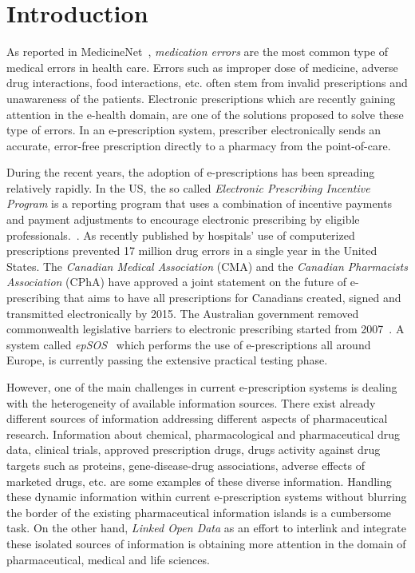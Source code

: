 \documentclass[conference]{IEEEtran}
\begin{document}
\section{Introduction}
\label{intro}

As reported in MedicineNet~\cite{medicationErrors}, \emph{medication errors} are the most common type of medical errors in health care.
Errors such as improper dose of medicine, adverse drug interactions, food interactions, etc. often stem from invalid prescriptions and unawareness of the patients.
Electronic prescriptions which are recently gaining attention in the e-health domain, are one of the solutions proposed to solve these type of errors.
In an e-prescription system, prescriber electronically sends an accurate, error-free prescription directly to a pharmacy from the point-of-care.

During the recent years, the adoption of e-prescriptions has been spreading relatively rapidly.
In the US, the so called \emph{Electronic Prescribing Incentive Program} is a reporting program that uses a combination of incentive payments and payment adjustments to encourage electronic prescribing by eligible professionals.~\cite{epincentive}.
As recently published by \cite{eprescStat2013} hospitals' use of computerized prescriptions prevented 17 million drug errors in a single year in the United States.
The \emph{Canadian Medical Association} (CMA) and the \emph{Canadian Pharmacists Association} (CPhA) have approved a joint statement on the future of e-prescribing that aims to have all prescriptions for Canadians created, signed and transmitted electronically by 2015.
The Australian government removed commonwealth legislative barriers to electronic prescribing started from 2007~\cite{medicare}.
A system called \emph{epSOS}~\cite{epsos} which performs the use of e-prescriptions all around Europe, is currently passing the extensive practical testing phase.

However, one of the main challenges in current e-prescription systems is dealing with the heterogeneity of available information sources.
There exist already different sources of information addressing different aspects of pharmaceutical research.
Information about chemical, pharmacological and pharmaceutical drug data, clinical trials, approved prescription drugs, drugs activity against drug targets such as proteins, gene-disease-drug associations, adverse effects of marketed drugs, etc. are some examples of these diverse information.
Handling these dynamic information within current e-prescription systems without blurring the border of the existing pharmaceutical information islands is a cumbersome task.
On the other hand, \emph{Linked Open Data} as an effort to interlink and integrate these isolated sources of information is obtaining more attention in the domain of pharmaceutical, medical and life sciences.
\end{document}
